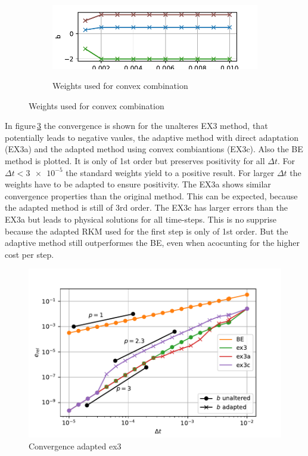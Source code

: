 \documentclass[a4paper]{scrartcl}
\numberwithin{equation}{section}
\theoremstyle{plain}
\theoremstyle{definition}
\numberwithin{theorem}{section}
\newcommand{\dt}{{\Delta t}}
\newcommand{\1}{\mathbbm{1}}
\begin{document}
\begin{figure}
\begin{subfigure}[b]{0.45\textwidth}
\caption{Solution of Diffusion for convex combiantion}
\label{fig:sol_Diff_c}
\includegraphics[width=1\textwidth]{plots/b_Diff_Convex.pdf}\\
\caption{Weights used for convex combination}
\label{fig:weights_Diff_c}
\end{subfigure}
\end{figure}


In figure\,\ref{fig:conv_impl} the convergence is shown for the unalteres EX3 method, that potentially leads to negative vaules, the adaptive method with direct adaptation (EX3a) and the adapted method using convex combiantions (EX3c). 
Also the BE method is plotted. It is only of 1st order but preserves positivity for all $\dt$.
For $\dt < \num{3e-5} $ the standard weights yield to a positive result. For larger $\dt$ the weights have to be adapted to ensure positivity.
The EX3a shows similar convergence properties than the original method.
This can be expected, because the adapted method is still of 3rd order.
The EX3c has larger errors than the EX3a but leads to physical solutions for all time-steps. 
This is no supprise because the adapted RKM used for the first step is only of 1st order.
But the adaptive method still outperformes the BE, even when acocunting for the higher cost per step.

\begin{figure}[h]
\centering
\includegraphics[scale=0.75]{plots/conv_heat.pdf}
\caption{Convergence adapted ex3}
\label{fig:conv_impl}
\end{figure}
\end{document}
